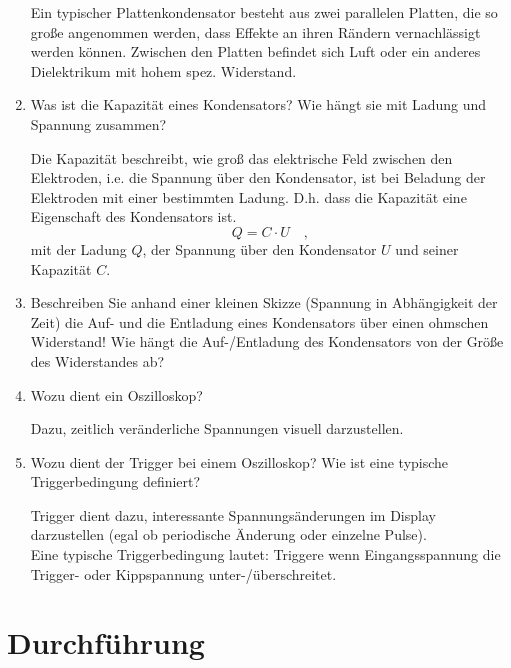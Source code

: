 \begin{tutorhint}
\begin{enumerate}
\begin{solution}
			Ein typischer Plattenkondensator besteht aus zwei parallelen Platten, die so große angenommen werden, dass Effekte an ihren Rändern vernachlässigt werden können. Zwischen den Platten befindet sich Luft oder ein anderes Dielektrikum mit hohem spez. Widerstand.
		\end{solution}
 \item Was ist die Kapazität eines Kondensators? Wie hängt sie mit Ladung und Spannung zusammen?
		\begin{solution}
			Die Kapazität beschreibt, wie groß das elektrische Feld zwischen den Elektroden, i.e. die Spannung über den Kondensator, ist bei Beladung der Elektroden mit einer bestimmten Ladung. D.h. dass die Kapazität eine Eigenschaft des Kondensators ist.
			\begin{equation*}
				Q = C\cdot U\quad,
			\end{equation*}
			mit der Ladung $Q$, der Spannung über den Kondensator $U$ und seiner Kapazität $C$.
		\end{solution}
 \item Beschreiben Sie anhand einer kleinen Skizze (Spannung in Abhängigkeit der Zeit) die Auf- und die Entladung eines Kondensators über einen ohmschen Widerstand! Wie hängt die Auf-/Entladung des Kondensators von der Größe des Widerstandes ab?
 \item Wozu dient ein Oszilloskop?
	\begin{solution}
		Dazu, zeitlich veränderliche Spannungen visuell darzustellen.
	\end{solution}
 \item Wozu dient der Trigger bei einem Oszilloskop? Wie ist eine typische Triggerbedingung definiert?
	\begin{solution}
		Trigger dient dazu, interessante Spannungsänderungen im Display darzustellen (egal ob periodische Änderung oder einzelne Pulse). \\
		Eine typische Triggerbedingung lautet: Triggere wenn Eingangsspannung die Trigger- oder Kippspannung unter-/überschreitet.
	\end{solution}
\end{enumerate}
\end{tutorhint}

\section{Durchführung} 

